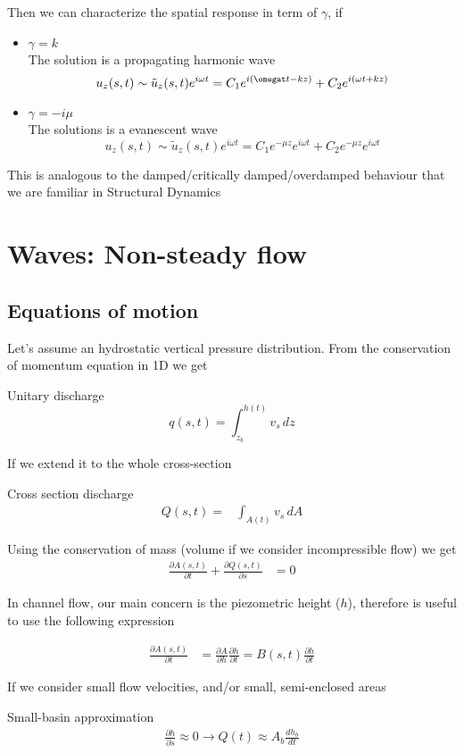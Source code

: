 \documentclass[a4paper, 11pt,article,oneside]{memoir}%
\begin{document}
Then we can characterize the spatial response in term of $\gamma$, if 
\begin{itemize}
\item $\gamma=k$ \\
The solution is a propagating harmonic wave
$$u_z(s,t)\sim \tilde{u}_z(s,t)e^{i\omega t}=C_1e^{i(\omegat t-kz)}+C_2e^{i(\omega t+kz)}$$
\item $\gamma=-i\mu$ \\
The solutions is a evanescent wave 
$$u_z(s,t)\sim \tilde{u}_z(s,t)e^{i\omega t}=C_1e^{-\mu z}e^{ i\omega t}+C_2e^{-\mu z}e^{i\omega t}$$
\end{itemize}
This is analogous to the damped/critically damped/overdamped behaviour that we are familiar in Structural Dynamics
\newpage
\chapter{Waves: Non-steady flow}
\section{Equations of motion}
Let's assume an hydrostatic vertical pressure distribution.
From the conservation of momentum equation in 1D we get\\
\begin{eqbox2}{}{Unitary discharge}
$$q(s,t)=\int_{z_b}^{h(t)} v_s\, dz$$
\end{eqbox2}
If we extend it to the whole cross-section 
\begin{eqbox2}{}{Cross section discharge}
\begin{align*}
Q(s,t)=&\int_{A(t)} v_s\, dA
\end{align*}
\end{eqbox2}

Using the conservation of mass (volume if we consider incompressible flow) we get 
\begin{align*}
\frac{\partial A(s,t)}{\partial t}+\frac{\partial Q(s,t)}{\partial s}&=0
\end{align*}

In channel flow, our main concern is the piezometric height ($h$), therefore is useful to use the following expression

\begin{align*}
\frac{\partial A(s,t)}{\partial t}&=\frac{\partial A}{\partial h}\frac{\partial h}{\partial t}=B(s,t)\frac{\partial h}{\partial t}
\end{align*}

If we consider small flow velocities, and/or small, semi-enclosed areas
\begin{eqbox2}{}{Small-basin approximation}
\begin{align*}
\frac{\partial h}{\partial s} \approx 0\longrightarrow Q(t)\approx A_b \frac{dh_b}{dt}
\end{align*}
\end{eqbox2}
 
\end{document}
